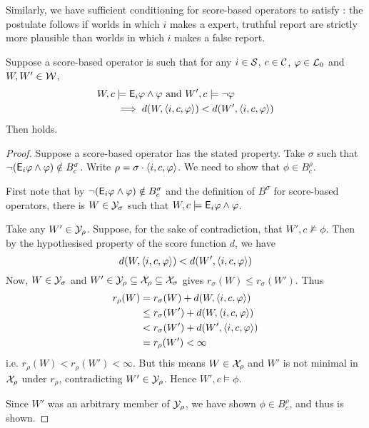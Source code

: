 Similarly, we have sufficient conditioning for score-based operators to satisfy
\strongcondsucc{}: the postulate follows if worlds in which $i$ makes a expert,
truthful report are strictly more plausible than worlds in which $i$ makes a
false report.

\begin{lemma}
    \label{kr_lemma_score_based_strongcondsucc_sufficient_conditions}
    Suppose a score-based operator is such that for any $i \in \mathcal{S}$, $c \in \mathcal{C}$,
    $\varphi \in \mathcal{L}{}_0$ and $W, W' \in \mathcal{W}$,
    \begin{align*}
        W, c &\models \mathsf{E}_i\varphi \land \varphi
        \text{ and }
        W', c \models \neg\varphi \\
        &\implies
        d(W, \langle {i, c, \varphi} \rangle) < d(W', \langle {i, c, \varphi} \rangle)
    \end{align*}
    Then \strongcondsucc{} holds.
\end{lemma}

\begin{proof}
    Suppose a score-based operator has the stated property. Take $\sigma$ such
    that $\neg(\mathsf{E}_i\varphi \land \varphi) \notin B^\sigma_c$. Write $\rho = \sigma
    \cdot \langle {i, c, \varphi} \rangle$. We need to show that $\phi \in B^\rho_c$.

    First note that by $\neg(\mathsf{E}_i\varphi \land \varphi) \notin B^\sigma_c$ and the
    definition of $B^\sigma$ for score-based operators, there is $W \in
    \mathcal{Y}_\sigma$ such that $W, c \models \mathsf{E}_i\varphi \land \varphi$.

    Take any $W' \in \mathcal{Y}_\rho$. Suppose, for the sake of contradiction, that
    $W', c \not\models \phi$. Then by the hypothesised property of the score
    function $d$, we have
    \[
        d(W, \langle {i, c, \varphi} \rangle) < d(W', \langle {i, c, \varphi} \rangle)
    \]
    Now, $W \in \mathcal{Y}_\sigma$ and $W' \in \mathcal{Y}_\rho \subseteq \mathcal{X}_\rho \subseteq
    \mathcal{X}_\sigma$ gives $r_\sigma(W) \le r_\sigma(W')$. Thus
    \begin{align*}
        r_\rho(W)
        &= r_\sigma(W) + d(W, \langle {i, c, \varphi} \rangle) \\
        &\le r_\sigma(W') + d(W, \langle {i, c, \varphi} \rangle) \\
        &< r_\sigma(W') + d(W', \langle {i, c, \varphi} \rangle) \\
        &= r_\rho(W') < \infty
    \end{align*}
    i.e. $r_\rho(W) < r_\rho(W') < \infty$. But this means $W \in \mathcal{X}_\rho$ and
    $W'$ is not minimal in $\mathcal{X}_\rho$ under $r_\rho$, contradicting $W' \in
    \mathcal{Y}_\rho$. Hence $W', c \models \phi$.

    Since $W'$ was an arbitrary member of $\mathcal{Y}_\rho$, we have shown $\phi \in
    B^\rho_c$, and thus \strongcondsucc{} is shown.
\end{proof}

